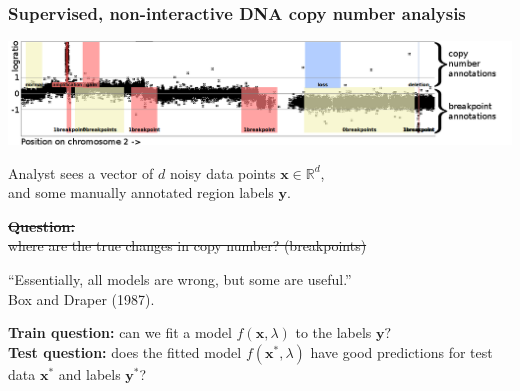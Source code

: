 \documentclass{beamer}
\newcommand{\RR}{\mathbb R}
\begin{document}
\begin{frame}[fragile]
  \frametitle{Supervised, non-interactive DNA copy number analysis}

  \includegraphics[width=\textwidth]{regions-axes-full}

  Analyst sees a vector of $d$ noisy data points $\mathbf x\in\RR^d$,\\
  and some manually annotated region labels $\mathbf y$.

  \vskip 0.1in

  \sout{\textbf{Question:}\\
    where are the true changes in copy number? (breakpoints)}

  \vskip 0.1in

  ``Essentially, all models are wrong, but some are useful.''\\
  Box and Draper (1987).

  \vskip 0.5cm

  \textbf{Train question:} can we fit a model $f(\mathbf x, \lambda)$
  to the labels $\mathbf y?$
  \\
  \textbf{Test question:} does the fitted model $f(\mathbf x^*, \lambda)$
  have good predictions for test data $\mathbf x^*$ and labels $\mathbf y^*$?

\end{frame}
\end{document}
